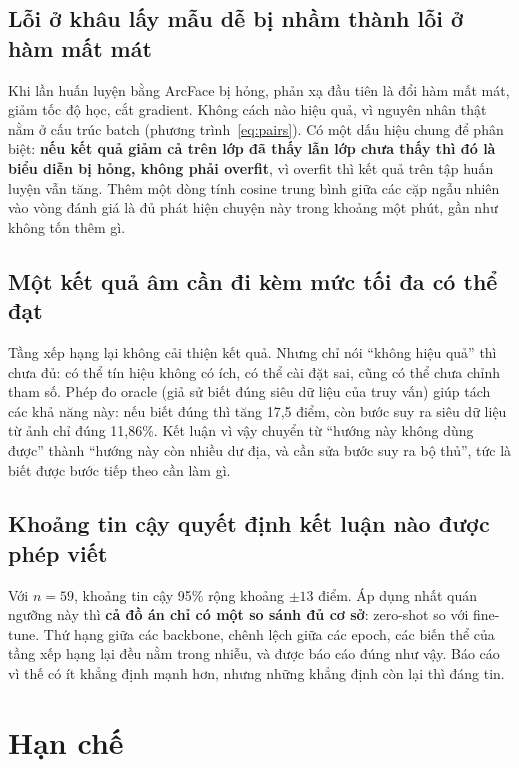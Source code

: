 \documentclass[conference,a4paper]{IEEEtran}
\begin{document}
\subsection{Lỗi ở khâu lấy mẫu dễ bị nhầm thành lỗi ở hàm mất mát}

Khi lần huấn luyện bằng ArcFace bị hỏng, phản xạ đầu tiên là đổi hàm mất mát, giảm tốc độ học, cắt
gradient. Không cách nào hiệu quả, vì nguyên nhân thật nằm ở cấu trúc batch (phương
trình~\eqref{eq:pairs}). Có một dấu hiệu chung để phân biệt: \textbf{nếu kết quả giảm cả trên lớp đã
thấy lẫn lớp chưa thấy thì đó là biểu diễn bị hỏng, không phải overfit}, vì overfit thì kết quả trên
tập huấn luyện vẫn tăng. Thêm một dòng tính cosine trung bình giữa các cặp ngẫu
nhiên~\cite{alignuniform} vào vòng đánh giá là đủ phát hiện chuyện này trong khoảng một phút, gần như
không tốn thêm gì.

\subsection{Một kết quả âm cần đi kèm mức tối đa có thể đạt}

Tầng xếp hạng lại không cải thiện kết quả. Nhưng chỉ nói ``không hiệu quả'' thì chưa đủ: có thể tín
hiệu không có ích, có thể cài đặt sai, cũng có thể chưa chỉnh tham số. Phép đo oracle (giả sử biết
đúng siêu dữ liệu của truy vấn) giúp tách các khả năng này: nếu biết đúng thì tăng 17,5 điểm, còn bước
suy ra siêu dữ liệu từ ảnh chỉ đúng 11,86\%. Kết luận vì vậy chuyển từ ``hướng này không dùng được''
thành ``hướng này còn nhiều dư địa, và cần sửa bước suy ra bộ thủ'', tức là biết được bước tiếp theo
cần làm gì.

\subsection{Khoảng tin cậy quyết định kết luận nào được phép viết}

Với $n = 59$, khoảng tin cậy 95\% rộng khoảng $\pm13$ điểm. Áp dụng nhất quán ngưỡng này thì
\textbf{cả đồ án chỉ có một so sánh đủ cơ sở}: zero-shot so với fine-tune. Thứ hạng giữa các backbone,
chênh lệch giữa các epoch, các biến thể của tầng xếp hạng lại đều nằm trong nhiễu, và được báo cáo
đúng như vậy. Báo cáo vì thế có ít khẳng định mạnh hơn, nhưng những khẳng định còn lại thì đáng tin.

\section{Hạn chế}
\end{document}
